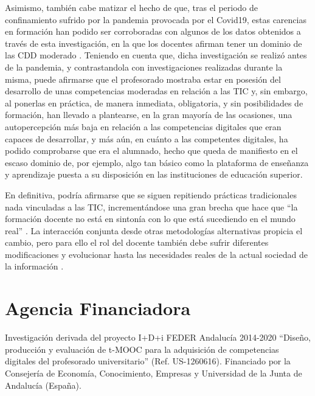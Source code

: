 \documentclass[spanish]{textolivre}
\begin{document}
Asimismo, también cabe matizar el hecho de que, tras el periodo de confinamiento sufrido por la pandemia provocada por el Covid19, estas carencias en formación han podido ser corroboradas con algunos de los datos obtenidos a través de esta investigación, en la que los docentes afirman tener un dominio de las CDD moderado \cite{trujillo2020}. Teniendo en cuenta que, dicha investigación se realizó antes de la pandemia, y contrastandola con investigaciones realizadas durante la misma, puede afirmarse que el profesorado mostraba estar en posesión del desarrollo de unas competencias moderadas en relación a las TIC y, sin embargo, al ponerlas en práctica, de manera inmediata, obligatoria, y sin posibilidades de formación, han llevado a plantearse, en la gran mayoría de las ocasiones, una autopercepción más baja en relación a las competencias digitales que eran capaces de desarrollar, y más aún, en cuánto a las competentes digitales, ha podido comprobarse que era el alumnado, hecho que queda de manifiesto en el escaso dominio de, por ejemplo, algo tan básico como la plataforma de enseñanza y aprendizaje puesta a su disposición en las instituciones de educación superior. 

En definitiva, podría afirmarse que se siguen repitiendo prácticas tradicionales nada vinculadas a las TIC, incrementándose una gran brecha que hace que “la formación docente no está en sintonía con lo que está sucediendo en el mundo real” \cite[p. 2]{sancho-gil2017}. La interacción conjunta desde otras metodologías alternativas propicia el cambio, pero para ello el rol del docente también debe sufrir diferentes modificaciones y evolucionar hasta las necesidades reales de la actual sociedad de la información \cite{spiteri2017}.


\printbibliography\label{sec-bib}


\section*{Agencia Financiadora}
Investigación derivada del proyecto I+D+i FEDER Andalucía 2014-2020 “Diseño, producción y evaluación de t-MOOC para la adquisición de competencias digitales del profesorado universitario” (Ref. US-1260616). Financiado por la Consejería de Economía, Conocimiento, Empresas y Universidad de la Junta de Andalucía (España). 
\end{document}
